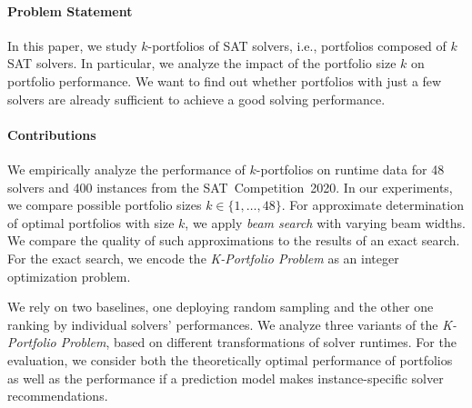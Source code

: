 \documentclass[conference]{IEEEtran}
\begin{document}
\paragraph{Problem Statement}

In this paper, we study $k$-portfolios of SAT solvers, i.e., portfolios composed of $k$ SAT solvers.
In particular, we analyze the impact of the portfolio size $k$ on portfolio performance.
We want to find out whether portfolios with just a few solvers are already sufficient to achieve a good solving performance. %

\paragraph{Contributions}

We empirically analyze the performance of $k$-portfolios on runtime data for 48 solvers and 400 instances from the SAT~Competition~2020. 
In our experiments, we compare possible portfolio sizes $k \in \{1, \dots, 48\}$. 
For approximate determination of optimal portfolios with size $k$, we apply \emph{beam search} with varying beam widths. %
We compare the quality of such approximations to the results of an exact search.
For the exact search, we encode the \emph{K-Portfolio Problem} as an integer optimization problem. 

We rely on two baselines, one deploying random sampling and the other one ranking by individual solvers' performances. %
We analyze three variants of the \emph{K-Portfolio Problem}, based on different transformations of solver runtimes. %
For the evaluation, we consider both the theoretically optimal performance of portfolios %
as well as the performance if a prediction model makes instance-specific solver recommendations. %
\end{document}

